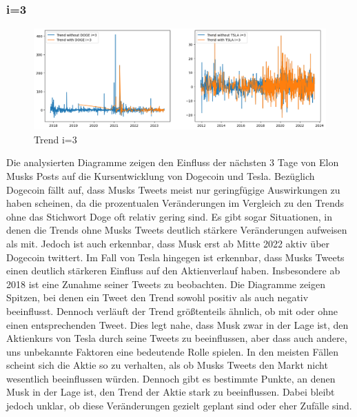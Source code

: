 \documentclass{article}
\begin{document}
\subsubsection{i=3} \label{i=3}
\begin{figure}[!htb]
  	\includegraphics[width=\textwidth, center]{../imgs/Trendi3.png}
 	\caption{Trend i=3}
 	\label{fig:Trendi3}
\end{figure}
Die analysierten Diagramme zeigen den Einfluss der nächsten 3 Tage von Elon Musks Posts auf die Kursentwicklung von Dogecoin und Tesla. Bezüglich Dogecoin fällt auf, dass Musks Tweets meist nur geringfügige Auswirkungen zu haben scheinen, da die prozentualen Veränderungen im Vergleich zu den Trends ohne das Stichwort Doge oft relativ gering sind. Es gibt sogar Situationen, in denen die Trends ohne Musks Tweets deutlich stärkere Veränderungen aufweisen als mit. Jedoch ist auch erkennbar, dass Musk erst ab Mitte 2022 aktiv über Dogecoin twittert.
Im Fall von Tesla hingegen ist erkennbar, dass Musks Tweets einen deutlich stärkeren Einfluss auf den Aktienverlauf haben. Insbesondere ab 2018 ist eine Zunahme seiner Tweets zu beobachten. Die Diagramme zeigen Spitzen, bei denen ein Tweet den Trend sowohl positiv als auch negativ beeinflusst. Dennoch verläuft der Trend größtenteils ähnlich, ob mit oder ohne einen entsprechenden Tweet. Dies legt nahe, dass Musk zwar in der Lage ist, den Aktienkurs von Tesla durch seine Tweets zu beeinflussen, aber dass auch andere, uns unbekannte Faktoren eine bedeutende Rolle spielen.
In den meisten Fällen scheint sich die Aktie so zu verhalten, als ob Musks Tweets den Markt nicht wesentlich beeinflussen würden. Dennoch gibt es bestimmte Punkte, an denen Musk in der Lage ist, den Trend der Aktie stark zu beeinflussen. Dabei bleibt jedoch unklar, ob diese Veränderungen gezielt geplant sind oder eher Zufälle sind.
\end{document}

